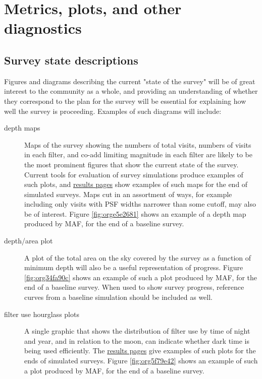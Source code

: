 \section{Metrics, plots, and other diagnostics}
\label{sec:org71f1fef}
\subsection{Survey state descriptions}
\label{sec:orgf06daac}
Figures and diagrams describing the current "state of the survey" will be of great interest to the community as a whole, and providing an understanding of whether they correspond to the plan for the survey will be essential for explaining how well the survey is proceeding.
Examples of such diagrams will include:

\begin{description}
\item[{depth maps}] Maps of the survey showing the numbers of total visits, numbers of visits in each filter, and co-add limiting magnitude in each filter are likely to be the most prominent figures that show the current state of the survey. Current tools for evaluation of survey simulations produce examples of such plots, and \href{http://astro-lsst-01.astro.washington.edu:8081/allMetricResults?runId=392\#Basic\%20Maps}{results pages} show examples of such maps for the end of simulated surveys. Maps cut in an assortment of ways, for example including only visits with PSF widths narrower than some cutoff, may also be of interest. Figure \ref{fig:orge5e2681} shows an example of a depth map produced by MAF, for the end of a baseline survey.
\item[{depth/area plot}] A plot of the total area on the sky covered by the survey as a function of minimum depth will also be a useful representation of progress. Figure \ref{fig:org34fa90c} shows an example of such a plot produced by MAF, for the end of a baseline survey. When used to show survey progress, reference curves from a baseline simulation should be included as well.
\item[{filter use hourglass plots}] A single graphic that shows the distribution of filter use by time of night and year, and in relation to the moon, can indicate whether dark time is being used efficiently. The \href{http://astro-lsst-01.astro.washington.edu:8081/allMetricResults?runId=392\#Hourglass}{results pages} give examples of such plots for the ends of simulated surveys. Figure \ref{fig:org5f79e42} shows an example of such a plot produced by MAF, for the end of a baseline survey.

\end{description}
